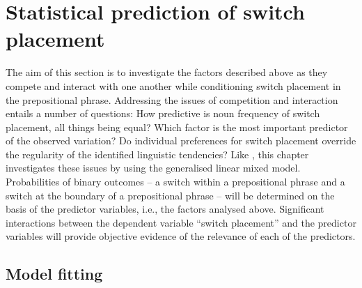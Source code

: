 \section{Statistical prediction of switch placement}

\noindent The aim of this section is to investigate the factors described above as they compete and interact with one another while conditioning switch placement in the prepositional phrase. Addressing the issues of competition and interaction entails a number of questions: How predictive is noun frequency of switch placement, all things being equal? Which factor is the most important predictor of the observed variation? Do individual preferences for switch placement override the regularity of the identified linguistic tendencies? Like , this chapter investigates these issues by using the generalised linear mixed model. Probabilities of binary outcomes -- a switch within a prepositional phrase and a switch at the boundary of a prepositional phrase -- will be determined on the basis of the predictor variables, i.e., the factors analysed above. Significant interactions between the dependent variable “switch placement” and the predictor variables will provide objective evidence of the relevance of each of the predictors.

\subsection{Model fitting}

